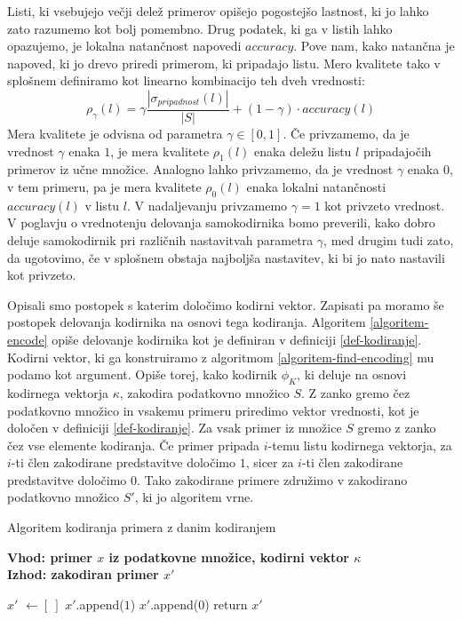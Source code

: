 \documentclass[12pt,a4paper,twoside]{article}
\theoremstyle{definition} %
\theoremstyle{plain} %
\numberwithin{equation}{section}  %
\begin{document}
Listi, ki vsebujejo večji delež primerov opišejo pogostejšo lastnost, ki jo lahko zato razumemo kot bolj pomembno. 
Drug podatek, ki ga v listih lahko opazujemo, je lokalna natančnost napovedi $\mathit{accuracy}$.
Pove nam, kako natančna je napoved, ki jo drevo priredi primerom, ki pripadajo listu.
Mero kvalitete tako v splošnem definiramo kot linearno kombinacijo teh dveh vrednosti:
\[
\rho_{\gamma}(l) = \gamma \frac{|\sigma_{\mathit{pripadnost}}(l)|}{|S|} + (1-\gamma) \cdot \mathit{accuracy}(l)
\]
\label{mera-kvalitete}
Mera kvalitete je odvisna od parametra $\gamma \in [0,1]$.
Če privzamemo, da je vrednost $\gamma$ enaka $1$, je mera kvalitete $\rho_1(l)$ enaka deležu listu $l$ pripadajočih primerov iz učne množice.
Analogno lahko privzamemo, da je vrednost $\gamma$ enaka $0$, v tem primeru, pa je mera kvalitete $\rho_0(l)$ enaka lokalni natančnosti $\mathit{accuracy}(l)$ v listu $l$.
%
V nadaljevanju privzamemo $\gamma = 1$ kot privzeto vrednost. %
V poglavju o vrednotenju delovanja samokodirnika bomo preverili, kako dobro deluje samokodirnik pri različnih nastavitvah parametra $\gamma$,
med drugim tudi zato, da ugotovimo, če v splošnem obstaja najboljša nastavitev, ki bi jo nato nastavili kot privzeto.

Opisali smo postopek s katerim določimo kodirni vektor. Zapisati pa moramo še postopek delovanja kodirnika na osnovi tega kodiranja.
Algoritem \ref{algoritem-encode} opiše delovanje kodirnika kot je definiran v definiciji \ref{def-kodiranje}. 
Kodirni vektor, ki ga konstruiramo z algoritmom \ref{algoritem-find-encoding} mu podamo kot argument.
Opiše torej, kako kodirnik $\phi_K$, ki deluje na osnovi kodirnega vektorja $\kappa$, zakodira podatkovno množico $S$. 
Z zanko gremo čez podatkovno množico in vsakemu primeru priredimo vektor vrednosti, kot je določen v definiciji \ref{def-kodiranje}.
Za vsak primer iz množice $S$ gremo z zanko čez vse elemente kodiranja. 
Če primer pripada $i$-temu listu kodirnega vektorja, za $i$-ti člen zakodirane predstavitve določimo $1$, sicer za $i$-ti člen zakodirane predstavitve določimo $0$.
Tako zakodirane primere združimo v zakodirano podatkovno množico $S'$, ki jo algoritem vrne.

\begin{algorithm}[ht]
  \caption{Algoritem kodiranja primera z danim kodiranjem}
  \label{algoritem-encode}
  \raggedright
  \textbf{Vhod: primer $x$ iz podatkovne množice, kodirni vektor $\kappa$}  \\
  \textbf{Izhod: zakodiran primer $x'$} 
  \begin{algorithmic}[0]
	\State $x'$ $\gets [\ ]$
			\State $x'$.append($1$)
		\Else
			\State $x'$.append($0$)
		\EndIf
	\EndFor
	\State return $x'$
  \end{algorithmic}
\end{algorithm}
\end{document}
